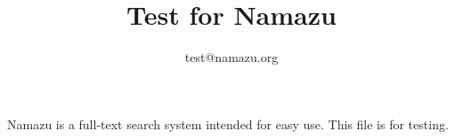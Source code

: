 \documentclass{article}
\title{Test for Namazu}
\author{test@namazu.org}
\begin{document}
\maketitle

Namazu is a full-text search system intended for easy
use.  This file is for testing.
\end{document}
